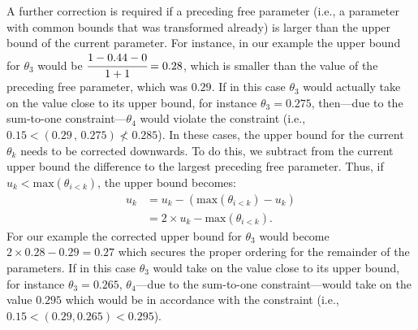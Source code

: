 \documentclass[
  english,
  man,floatsintext]{apa6}
\begin{document}
A further correction is required if a preceding free parameter (i.e., a
parameter with common bounds that was transformed already) is larger
than the upper bound of the current parameter. For instance, in our
example the upper bound for \(\theta_3\) would be
\(\cfrac{1 - 0.44 - 0}{1 + 1} = 0.28\), which is smaller than the value
of the preceding free parameter, which was \(0.29\). If in this case
\(\theta_3\) would actually take on the value close to its upper bound,
for instance \(\theta_3 = 0.275\), then---due to the sum-to-one
constraint---\(\theta_4\) would violate the constraint (i.e.,
\(0.15 < (0.29\, , \, 0.275) \nless 0.285\)). In these cases, the upper
bound for the current \(\theta_k\) needs to be corrected downwards. To
do this, we subtract from the current upper bound the difference to the
largest preceding free parameter. Thus, if
\(u_k < \text{max}(\theta_{i < k})\), the upper bound becomes:
\begin{align}
u_k &= u_k - (\text{max}(\theta_{i < k}) - u_k) \\
&= 2 \times u_k - \text{max}(\theta_{i < k}).
\end{align} For our example the corrected upper bound for \(\theta_3\)
would become \(2 \times 0.28 - 0.29 = 0.27\) which secures the proper
ordering for the remainder of the parameters. If in this case
\(\theta_3\) would take on the value close to its upper bound, for
instance \(\theta_3 = 0.265\), \(\theta_4\)---due to the sum-to-one
constraint---would take on the value \(0.295\) which would be in
accordance with the constraint (i.e., \(0.15 < (0.29, 0.265) < 0.295\)).

\clearpage
\end{document}
